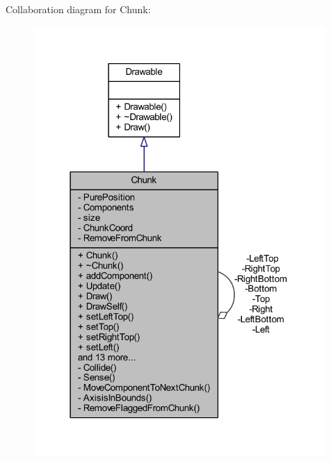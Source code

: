 Collaboration diagram for Chunk\-:\nopagebreak
\begin{figure}[H]
\begin{center}
\leavevmode
\includegraphics[width=315pt]{class_chunk__coll__graph}
\end{center}
\end{figure}
